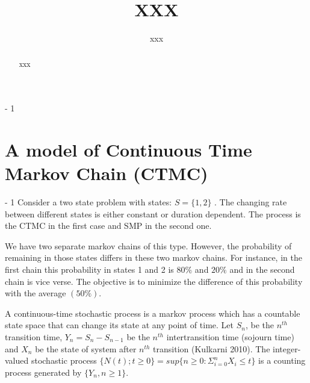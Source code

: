 \documentclass[12pt,letterpaper]{article}
\newcommand{\MyTabs}{ \hspace*{15.mm} \= ... \kill }
\begin{document}
\renewcommand{\refname}{REFERENCES}

\title{XXX}

\author {xxx}%

\date{}

\maketitle

\begin{abstract}
\noindent{}
xxx
\end{abstract}



\looseness - 1


\section*{A model of Continuous Time Markov Chain (CTMC) }\label{sec:Semi Markov Process (SMP)}
\looseness - 1
Consider a two state problem with states: $S=\{1,2\}$ . The changing rate between different states is either constant or duration dependent. The process is the CTMC in the first case and SMP in the second one.


We have two separate markov chains of this type. However, the probability of remaining in those states differs in these two markov chains. For instance, in the first chain this probability in states 1 and 2 is $80\%$ and $20\%$ and in the second chain is vice verse. The objective is to minimize the difference of this probability with the average $(50\%)$. 

A continuous-time stochastic process is a markov process which has a countable state space that can change its state at any point of time. Let $S_n$, be the $n^{th}$ transition time, $Y_n= S_n-S_{n-1}$ be the $n^{th}$ intertransition time (sojourn time) and $X_n$ be the state of system after $n^{th}$ transition (Kulkarni 2010). The integer-valued stochastic process $\{N(t); t\geq0 \}= sup\{n\geq0 : \Sigma_{i=0}^n X_i \leq t\}$ is a counting process generated by $\{Y_n, n\geq1\}$.
\end{document}
